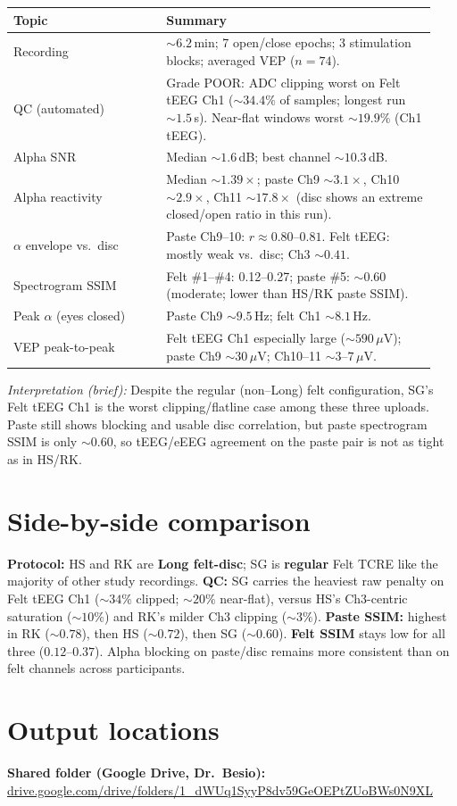 \documentclass[11pt]{article}
\begin{document}
\begin{table}[h]
  \centering
  \small
  \begin{tabular}{@{}p{0.34\linewidth}p{0.60\linewidth}@{}}
    \toprule
    \textbf{Topic} & \textbf{Summary} \\
    \midrule
    Recording & ${\sim}6.2$\,min; 7 open/close epochs; 3 stimulation blocks; averaged VEP ($n=74$). \\
    QC (automated) & Grade POOR: ADC clipping worst on Felt tEEG Ch1 (${\sim}34.4\%$ of samples; longest run ${\sim}1.5$\,s). Near-flat windows worst ${\sim}19.9\%$ (Ch1 tEEG). \\
    Alpha SNR & Median ${\sim}1.6$\,dB; best channel ${\sim}10.3$\,dB. \\
    Alpha reactivity & Median ${\sim}1.39\times$; paste Ch9 ${\sim}3.1\times$, Ch10 ${\sim}2.9\times$, Ch11 ${\sim}17.8\times$ (disc shows an extreme closed/open ratio in this run). \\
    $\alpha$ envelope vs.\ disc & Paste Ch9--10: $r \approx 0.80$--$0.81$. Felt tEEG: mostly weak vs.\ disc; Ch3 ${\sim}0.41$. \\
    Spectrogram SSIM & Felt \#1--\#4: 0.12--0.27; paste \#5: ${\sim}0.60$ (moderate; lower than HS/RK paste SSIM). \\
    Peak $\alpha$ (eyes closed) & Paste Ch9 ${\sim}9.5$\,Hz; felt Ch1 ${\sim}8.1$\,Hz. \\
    VEP peak-to-peak & Felt tEEG Ch1 especially large (${\sim}590$\,$\mu$V); paste Ch9 ${\sim}30$\,$\mu$V; Ch10--11 ${\sim}3$--$7$\,$\mu$V. \\
    \bottomrule
  \end{tabular}
\end{table}

\noindent\textit{Interpretation (brief):} Despite the regular (non--Long) felt configuration, SG's Felt tEEG Ch1 is the worst clipping/flatline case among these three uploads. Paste still shows blocking and usable disc correlation, but paste spectrogram SSIM is only ${\sim}0.60$, so tEEG/eEEG agreement on the paste pair is not as tight as in HS/RK.

\section*{Side-by-side comparison}
\textbf{Protocol:} HS and RK are \textbf{Long felt-disc}; SG is \textbf{regular} Felt TCRE like the majority of other study recordings. \textbf{QC:} SG carries the heaviest raw penalty on Felt tEEG Ch1 (${\sim}34\%$ clipped; ${\sim}20\%$ near-flat), versus HS's Ch3-centric saturation (${\sim}10\%$) and RK's milder Ch3 clipping (${\sim}3\%$). \textbf{Paste SSIM:} highest in RK (${\sim}0.78$), then HS (${\sim}0.72$), then SG (${\sim}0.60$). \textbf{Felt SSIM} stays low for all three ($0.12$--$0.37$). Alpha blocking on paste/disc remains more consistent than on felt channels across participants.

\section*{Output locations}
\noindent\textbf{Shared folder (Google Drive, Dr.\ Besio):}\\
\href{https://drive.google.com/drive/folders/1_dWUq1SyyP8dv59GeOEPtZUoBWs0N9XL?usp=drive_link}{drive.google.com/drive/folders/1\_dWUq1SyyP8dv59GeOEPtZUoBWs0N9XL}
\end{document}
